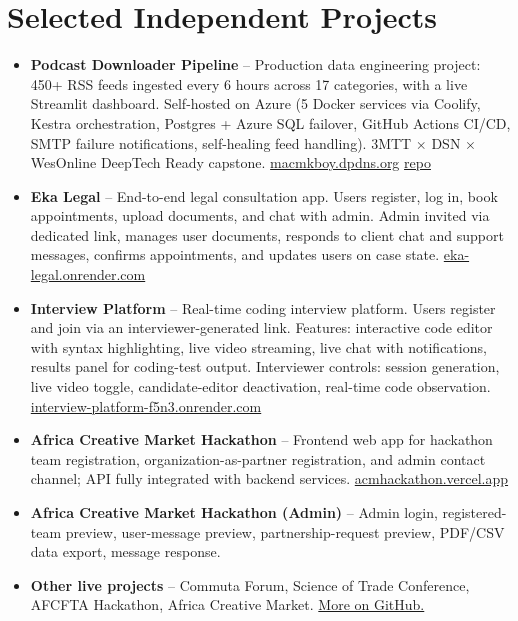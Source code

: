 \documentclass[11pt,a4paper,sans]{moderncv}
\begin{document}

\section{Selected Independent Projects}
\vspace{3pt}
\begin{itemize}

\item{\textbf{Podcast Downloader Pipeline} -- Production data engineering project: 450+ RSS feeds ingested every 6 hours across 17 categories, with a live Streamlit dashboard. Self-hosted on Azure (5 Docker services via Coolify, Kestra orchestration, Postgres + Azure SQL failover, GitHub Actions CI/CD, SMTP failure notifications, self-healing feed handling). 3MTT $\times$ DSN $\times$ WesOnline DeepTech Ready capstone. \href{http://macmkboy.dpdns.org}{macmkboy.dpdns.org} \textbar{} \href{https://github.com/pyth0nkod3r/podcast-downloader-pipeline}{repo}}

\item{\textbf{Eka Legal} -- End-to-end legal consultation app. Users register, log in, book appointments, upload documents, and chat with admin. Admin invited via dedicated link, manages user documents, responds to client chat and support messages, confirms appointments, and updates users on case state. \href{https://eka-legal.onrender.com}{eka-legal.onrender.com}}

\item{\textbf{Interview Platform} -- Real-time coding interview platform. Users register and join via an interviewer-generated link. Features: interactive code editor with syntax highlighting, live video streaming, live chat with notifications, results panel for coding-test output. Interviewer controls: session generation, live video toggle, candidate-editor deactivation, real-time code observation. \href{https://interview-platform-f5n3.onrender.com/}{interview-platform-f5n3.onrender.com}}

\item{\textbf{Africa Creative Market Hackathon} -- Frontend web app for hackathon team registration, organization-as-partner registration, and admin contact channel; API fully integrated with backend services. \href{https://acm-hackathon.vercel.app}{acmhackathon.vercel.app}}

\item{\textbf{Africa Creative Market Hackathon (Admin)} -- Admin login, registered-team preview, user-message preview, partnership-request preview, PDF/CSV data export, message response.}

\item{\textbf{Other live projects} -- Commuta Forum, Science of Trade Conference, AFCFTA Hackathon, Africa Creative Market. \href{https://github.com/pyth0nkod3r}{More on GitHub.}}

\end{itemize}
\end{document}
